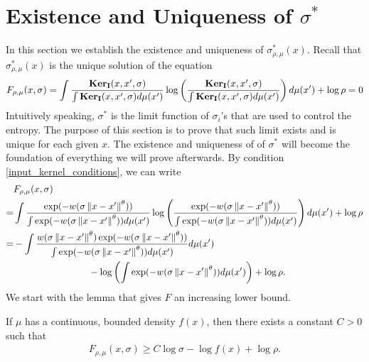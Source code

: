 \section{Existence and Uniqueness of \texorpdfstring{$\sigma^*$}{sigma-star}}\label{tsne:sec:existence_uniqueness}
In this section we establish the existence and uniqueness of $\sigma^*_{\rho,\mu}(x)$. Recall that $\sigma^*_{\rho,\mu}(x)$ is the unique solution of the equation
\begin{align}
    F_{\rho,\mu}(x,\sigma) = \int \frac{\mathbf{Ker}_{\mathbf{I}}(x,x',\sigma)}{\int \mathbf{Ker}_{\mathbf{I}}(x,x',\sigma)d\mu(x')} \log \left(\frac{\mathbf{Ker}_{\mathbf{I}}(x,x',\sigma)}{\int \mathbf{Ker}_{\mathbf{I}}(x,x',\sigma)d\mu(x')}\right) d\mu(x') + \log \rho = 0
\end{align}
Intuitively speaking, $\sigma^*$ is the limit function of $\sigma_i$'s that are used to control the entropy. The purpose of this section is to prove that such limit exists and is unique for each given $x$. The existence and uniqueness of of $\sigma^*$ will become the foundation of everything we will prove afterwards. By condition \ref{input_kernel_conditions}, we can write
\begin{align} \label{big_F_formula}
      & F_{\rho,\mu}(x,\sigma) \nonumber                                                                                                                                                                                                                    \\
    = & \int \frac{\exp(-w(\sigma\left\lVert x-x'\right\rVert^{\theta}))}{\int \exp(-w(\sigma\left\lVert x-x'\right\rVert^{\theta})) d\mu(x')} \log\left(\frac{\exp(-w(\sigma\left\lVert x-x'\right\rVert^{\theta}))}{\int \exp(-w(\sigma\left\lVert x-x'\right\rVert^{\theta})) d\mu(x')}\right)d\mu(x') + \log \rho \nonumber \\
    = & -\int \frac{w(\sigma\left\lVert x-x'\right\rVert^{\theta})\exp(-w(\sigma\left\lVert x-x'\right\rVert^{\theta}))}{\int \exp(-w(\sigma\left\lVert x-x'\right\rVert^{\theta})) d\mu(x')} d\mu(x') \nonumber                                                                                               \\
      & \qquad \qquad \qquad \qquad - \log \left(\int \exp(-w(\sigma\left\lVert x-x'\right\rVert^{\theta}))d\mu(x')\right)  + \log \rho.
\end{align}
We start with the lemma that gives $F$ an increasing lower bound.
\begin{lemma} \label{existence_uniqueness:existence_lemma}
    If $\mu$ has a continuous, bounded density $f(x)$, then there exists a constant $C>0$ such that
    \begin{align}  \label{big_F_lowerbound_final}
        F_{\rho,\mu}(x,\sigma) \geq C \log \sigma - \log f(x) + \log \rho.
    \end{align}
\end{lemma}

